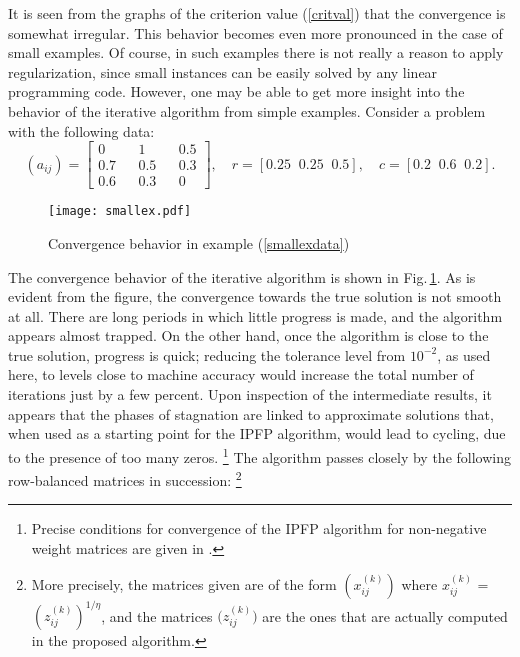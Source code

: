 \documentclass{article}
\theoremstyle{definition}
\renewcommand{\baselinestretch}{1.5}
\let\origfootnote\footnote
\renewcommand{\footnote}[1]{%
   \begingroup
   \renewcommand{\baselinestretch}{1}%
   \origfootnote{#1}%
   \endgroup}
\begin{document}
It is seen from the graphs of the criterion value (\ref{critval}) that the convergence is somewhat irregular. This behavior becomes
even more pronounced in the case of small examples. Of course, in such examples there is not really a reason to apply regularization,
since small instances can be easily solved by any linear programming code. However, one may be able to get more insight into the
behavior of the iterative algorithm from simple examples. Consider a problem with the following data:
\begin{equation} \label{smallexdata}
(a_{ij}) = \begin{bmatrix}
0 && 1 && 0.5 \\ 0.7 && 0.5 && 0.3 \\ 0.6 && 0.3 && 0
\end{bmatrix},
\quad r = [ 0.25 \;\; 0.25 \;\; 0.5], \quad c = [0.2 \;\; 0.6 \;\; 0.2].
\end{equation}
\begin{figure}[t]
\begin{center}
\texttt{[image: smallex.pdf]}
\end{center}
\caption{Convergence behavior in example (\ref{smallexdata}) \label{smallex}}
\end{figure}
\vskip0mm\noindent
The convergence behavior of the iterative algorithm is shown in Fig.\,\ref{smallex}. As is evident from the figure, the convergence towards the true solution is not smooth at all. There are long periods in which little progress is made, and the algorithm appears almost trapped. On the other hand, once the algorithm is close to the true solution, progress is quick; reducing the tolerance level from $10^{-2}$, as used here, to levels close to machine accuracy would increase the total number of iterations just by a few percent. Upon inspection of the intermediate results, it appears that the phases of stagnation are linked to approximate solutions that, when used as a starting point for the IPFP algorithm, would lead to cycling, due to the presence of too many zeros.\footnote{Precise conditions for convergence of the IPFP algorithm for non-negative weight matrices are given in \cite{Pukelsheim}.} The algorithm passes closely by the following row-balanced matrices in succession:\footnote{More precisely, the matrices given are of the form $(x_{ij}^{(k)}) $ where $x^{(k)}_{ij}$ = $(z^{(k)}_{ij})^{1/\eta}$, and the matrices $\big(z_{ij}^{(k)}\big)$ are the ones that are actually computed in the proposed algorithm.}
\end{document}
